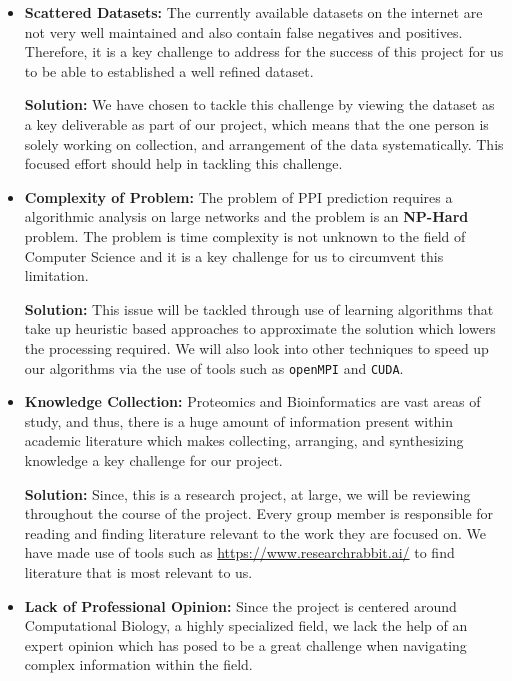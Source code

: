 \begin{itemize}
    \item \textbf{Scattered Datasets:} The currently available datasets on the internet are not very well maintained and also contain false negatives and positives. Therefore, it is a key challenge to address for the success of this project for us to be able to established a well refined dataset. 
    
    \textbf{Solution:} We have chosen to tackle this challenge by viewing the dataset as a key deliverable as part of our project, which means that the one person is solely working on collection, and arrangement of the data systematically. This focused effort should help in tackling this challenge.
    
    \item \textbf{Complexity of Problem:} The problem of PPI prediction requires a algorithmic analysis on large networks and the problem is an \textbf{NP-Hard} problem. The problem is time complexity is not unknown to the field of Computer Science and it is a key challenge for us to circumvent this limitation.
    
    \textbf{Solution:} This issue will be tackled through use of learning algorithms that take up heuristic based approaches to approximate the solution which lowers the processing required. We will also look into other techniques to speed up our algorithms via the use of tools such as \texttt{openMPI} and \texttt{CUDA}.
    
    \item \textbf{Knowledge Collection:} Proteomics and Bioinformatics are vast areas of study, and thus, there is a huge amount of information present within academic literature which makes collecting, arranging, and synthesizing knowledge a key challenge for our project.
    
    \textbf{Solution:} Since, this is a research project, at large, we will be reviewing throughout the course of the project. Every group member is responsible for reading and finding literature relevant to the work they are focused on. We have made use of tools such as \url{https://www.researchrabbit.ai/} to find literature that is most relevant to us. 
    
    \item \textbf{Lack of Professional Opinion:} Since the project is centered around Computational Biology, a highly specialized field, we lack the help of an expert opinion which has posed to be a great challenge when navigating complex information within the field. 
    

\end{itemize}
